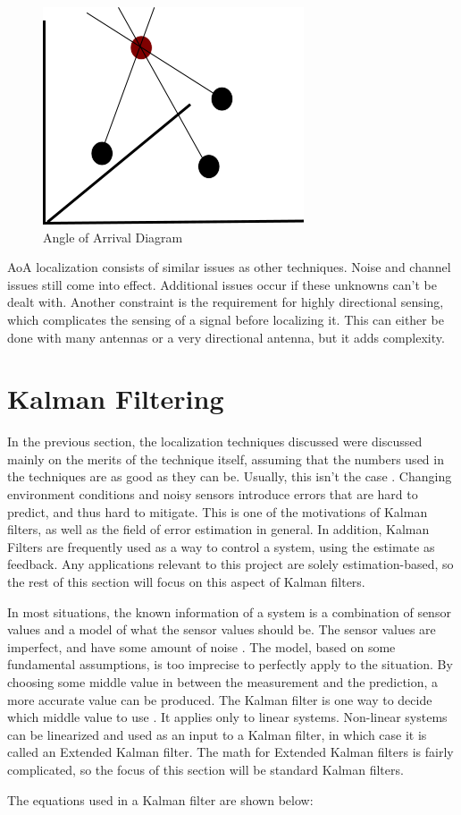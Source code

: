 \begin{figure}[ht]
\centering
\includegraphics[scale=0.5]{img/path4188.png}
\caption{Angle of Arrival Diagram}
\label{fig:aoa_diagram}
\end{figure}\par
AoA localization consists of similar issues as other techniques. Noise and channel issues still come into effect. Additional issues occur if these unknowns can’t be dealt with. Another constraint is the requirement for highly directional sensing, which complicates the sensing of a signal before localizing it. This can either be done with many antennas or a very directional antenna, but it adds complexity.

\section{Kalman Filtering}
In the previous section, the localization techniques discussed were discussed mainly on the merits of the technique itself, assuming that the numbers used in the techniques are as good as they can be. Usually, this isn't the case \cite{kf_book}. Changing environment conditions and noisy sensors introduce errors that are hard to predict, and thus hard to mitigate. This is one of the motivations of Kalman filters, as well as the field of error estimation in general. In addition, Kalman Filters are frequently used as a way to control a system, using the estimate as feedback. Any applications relevant to this project are solely estimation-based, so the rest of this section will focus on this aspect of Kalman filters. \par

In most situations, the known information of a system is a combination of sensor values and a model of what the sensor values should be. The sensor values are imperfect, and have some amount of noise \cite{kf_pictures}. The model, based on some fundamental assumptions, is too imprecise to perfectly apply to the situation. By choosing some middle value in between the measurement and the prediction, a more accurate value can be produced. The Kalman filter is one way to decide which middle value to use \cite{kf_robots}. It applies only to linear systems. Non-linear systems can be linearized and used as an input to a Kalman filter, in which case it is called an Extended Kalman filter. The math for Extended Kalman filters is fairly complicated, so the focus of this section will be standard Kalman filters.\par
The equations used in a Kalman filter are shown below:

